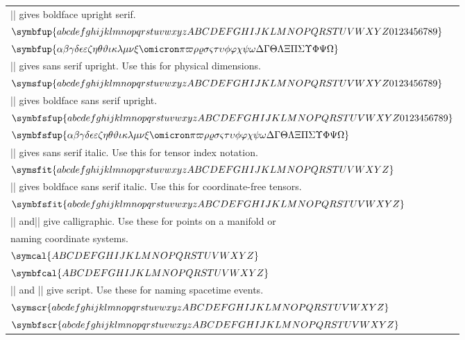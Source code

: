\documentclass{article}
\begin{document}
\begin{center}
\begin{tabular}{l}
    |\symbfup{...}| gives boldface upright serif. \\
    \( \symbfup{abcdefghijklmnopqrstuvwxyzABCDEFGHIJKLMNOPQRSTUVWXYZ0123456789} \) \\
    \( \symbfup{ 
       \alpha\beta\gamma\delta\epsilon\varepsilon\zeta\eta\theta\vartheta\iota\kappa
       \lambda\mu\nu\xi\omicron\pi\varpi\rho\varrho\sigma\varsigma\tau\upsilon\phi\varphi
       \chi\psi\omega\Delta\Gamma\Theta\Lambda\Xi\Pi\Sigma\Upsilon\Phi\Psi\Omega}
    \) \\
    |\symsfup{...}| gives sans serif upright. Use this for physical dimensions. \\
    \( \symsfup{abcdefghijklmnopqrstuvwxyzABCDEFGHIJKLMNOPQRSTUVWXYZ0123456789} \) \\
    |\symbfsfup{...}| gives boldface sans serif upright. \\
    \( \symbfsfup{abcdefghijklmnopqrstuvwxyzABCDEFGHIJKLMNOPQRSTUVWXYZ0123456789} \) \\
    \( \symbfsfup{ 
       \alpha\beta\gamma\delta\epsilon\varepsilon\zeta\eta\theta\vartheta\iota\kappa
       \lambda\mu\nu\xi\omicron\pi\varpi\rho\varrho\sigma\varsigma\tau\upsilon\phi\varphi
       \chi\psi\omega\Delta\Gamma\Theta\Lambda\Xi\Pi\Sigma\Upsilon\Phi\Psi\Omega}
    \) \\
    |\symsfit{...}| gives sans serif italic. Use this for tensor index notation. \\
    \( \symsfit{abcdefghijklmnopqrstuvwxyzABCDEFGHIJKLMNOPQRSTUVWXYZ} \) \\
    |\symbfsfit{...}| gives boldface sans serif italic. Use this for 
    coordinate-free tensors.  \\
    \( \symbfsfit{abcdefghijklmnopqrstuvwxyzABCDEFGHIJKLMNOPQRSTUVWXYZ} \) \\
    |\symcal{...}| and|\symbfcal{...}| give calligraphic. Use these for 
    points on a manifold or \\
    naming coordinate systems. \\
    \( \symcal{ABCDEFGHIJKLMNOPQRSTUVWXYZ} \) \\
    \( \symbfcal{ABCDEFGHIJKLMNOPQRSTUVWXYZ} \) \\
    |\symscr{...}| and |\symbfscr{...}| give script. Use these for
    naming spacetime events. \\
    \( \symscr{abcdefghijklmnopqrstuvwxyzABCDEFGHIJKLMNOPQRSTUVWXYZ} \) \\
    \( \symbfscr{abcdefghijklmnopqrstuvwxyzABCDEFGHIJKLMNOPQRSTUVWXYZ} \) \\

\end{tabular}
\end{center}
\end{document}
